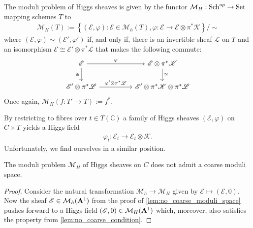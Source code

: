 \documentclass[12pt]{ociamthesis}  %
\begin{document}
\begin{definition}\label{def:higgs_moduli_problem}
  The moduli problem of Higgs sheaves is given by the functor
  $\mathcal M_H : \operatorname{Sch}^{op}\to \operatorname{Set}$ mapping schemes $T$ to
  \begin{align*}
    \mathcal M_H(T) := \left\lbrace{(\mathscr E,\varphi) : \mathscr E\in\mathcal M_h(T), \varphi : \mathscr E \to \mathscr E \otimes \pi^*\mathscr K }\right\rbrace/\sim
  \end{align*}
  where $(\mathscr E,\varphi)\sim(\mathscr E',\varphi')$ if, and only if,
  there is an invertible sheaf $\mathscr L$ on $T$ and an isomorphism
  $\mathscr E\cong\mathscr E'\otimes\pi^*\mathscr L$ that makes the following
  commute:
  \begin{equation*}
    \begin{tikzcd}
      {\mathscr E} && {\mathscr E\otimes \pi^*\mathscr K} \\
      {\mathscr E'\otimes\pi^*\mathscr L} && {\mathscr E'\otimes\pi^*\mathscr K\otimes\pi^*\mathscr L}
      \arrow["\varphi", from=1-1, to=1-3]
      \arrow["\cong"', from=1-1, to=2-1]
      \arrow["\cong", from=1-3, to=2-3]
      \arrow["{\varphi'\otimes\pi^*\mathscr L}", from=2-1, to=2-3]
    \end{tikzcd}
  \end{equation*}
  Once again, $\mathcal M_H(f : T' \to T) := f^*$.
\end{definition}
By restricting to fibres over $t\in T(\mathbb{C})$
a family of Higgs sheaves $(\mathscr E,\varphi)$ on $C\times T$ yields
a Higgs field
\begin{align*}
  \varphi_t : \mathscr E_t \to \mathscr E_t \otimes \mathscr K.
\end{align*}
Unfortunately, we find ourselves in a similar position.
\begin{corollary}
  The moduli problem $\mathcal M_H$ of Higgs sheaves on $C$ does not admit
  a coarse moduli space.
  \begin{proof}
    Consider the natural transformation $\mathcal M_h\to\mathcal M_H$
    given by $\mathscr E \mapsto (\mathscr E,0)$. Now the sheaf
    $\mathscr E\in\mathcal M_h(\mathbf{A}^{1}_{})$ from the proof of
    \ref{lem:no_coarse_moduli_space} pushes forward to a Higgs field
    $(\mathscr E,0)\in\mathcal M_H(\mathbf{A}^{1}_{})$ which, moreover,
    also satisfies the property from \ref{lem:no_coarse_condition}.
  \end{proof}
\end{corollary}
\end{document}
